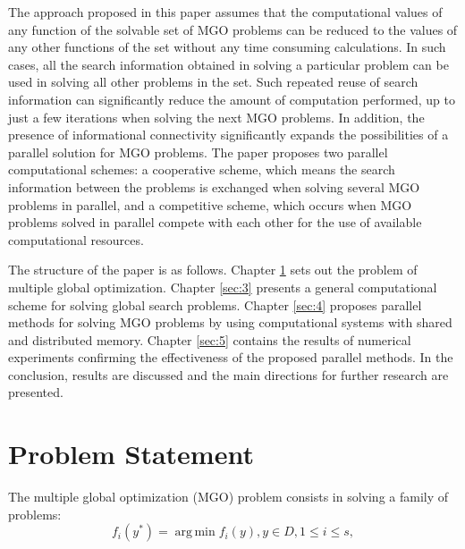 \documentclass[review]{elsarticle}
\DeclareMathOperator*{\argmin}{arg\,min}
\begin{document}
The approach proposed in this paper assumes that the computational values of any function of the solvable set of MGO problems can be reduced to the values of any other functions of the set without any time consuming calculations. In such cases, all the search information obtained in solving a particular problem can be used in solving all other problems in the set. Such repeated reuse of search information can significantly reduce the amount of computation performed, up to just a few iterations when solving the next MGO problems. In addition, the presence of informational connectivity significantly expands the possibilities of a parallel solution for MGO problems. The paper proposes two parallel computational schemes: a cooperative scheme, which means the search information between the problems is exchanged when solving several MGO problems in parallel, and a competitive scheme, which occurs when MGO problems solved in parallel compete with each other for the use of available computational resources.

The structure of the paper is as follows. Chapter \ref{sec:2} sets out the problem of multiple global optimization. Chapter \ref{sec:3} presents a general computational scheme for solving global search problems. Chapter \ref{sec:4} proposes parallel methods for solving MGO problems by using computational systems with shared and distributed memory. Chapter \ref{sec:5} contains the results of numerical experiments confirming the effectiveness of the proposed parallel methods. In the conclusion, results are discussed and the main directions for further research are presented.

\section{Problem Statement}\label{sec:2}

The multiple global optimization (MGO) problem consists in solving a family of problems:
\begin{equation}\label{eq:1}
f_i(y^*) = \argmin f_i(y), y \in D, 1 \leq i \leq s,
\end{equation}
\end{document}
